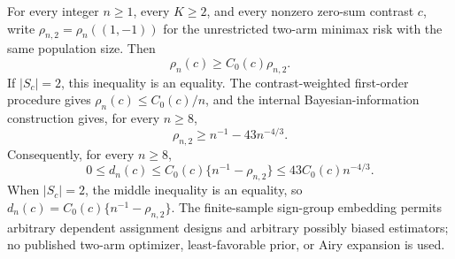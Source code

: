 For every integer \(n\geq1\), every \(K\geq2\), and every nonzero zero-sum contrast \(c\), write \(\rho_{n,2}=\rho_n((1,-1))\) for the unrestricted two-arm minimax risk with the same population size. Then
\[
 \rho_n(c)\geq C_0(c)\rho_{n,2}.
\]
If \(|S_c|=2\), this inequality is an equality. The contrast-weighted first-order procedure gives \(\rho_n(c)\leq C_0(c)/n\), and the internal Bayesian-information construction gives, for every \(n\geq8\),
\[
 \rho_{n,2}\geq n^{-1}-43n^{-4/3}.
\]
Consequently, for every \(n\geq8\),
\[
 0\leq d_n(c)\leq C_0(c)\{n^{-1}-\rho_{n,2}\}
 \leq43C_0(c)n^{-4/3}.
\]
When \(|S_c|=2\), the middle inequality is an equality, so \(d_n(c)=C_0(c)\{n^{-1}-\rho_{n,2}\}\). The finite-sample sign-group embedding permits arbitrary dependent assignment designs and arbitrary possibly biased estimators; no published two-arm optimizer, least-favorable prior, or Airy expansion is used.